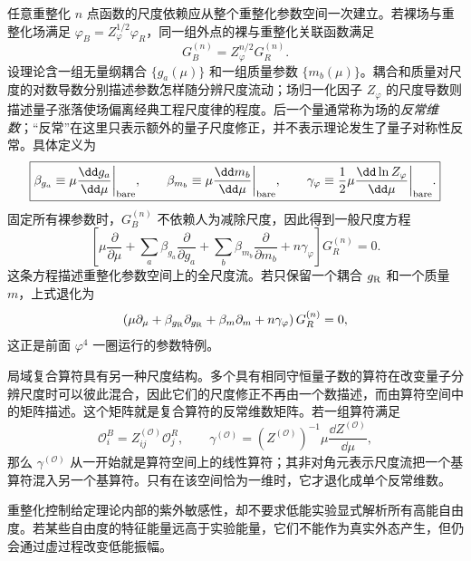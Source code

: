任意重整化 $n$ 点函数的尺度依赖应从整个重整化参数空间一次建立。若裸场与重整化场满足 $\varphi_B=Z_\varphi^{1/2}\varphi_R$，同一组外点的裸与重整化关联函数满足
\begin{equation}
 \boxed{
 G_B^{(n)}=Z_\varphi^{n/2}G_R^{(n)}.}
 \label{eq:bare-ren-green-relation-r68}
\end{equation}
设理论含一组无量纲耦合 $\{g_a(\mu)\}$ 和一组质量参数 $\{m_b(\mu)\}$。耦合和质量对尺度的对数导数分别描述参数怎样随分辨尺度流动；场归一化因子 $Z_\varphi$ 的尺度导数则描述量子涨落使场偏离经典工程尺度律的程度。后一个量通常称为场的\emph{反常维数}；“反常”在这里只表示额外的量子尺度修正，并不表示理论发生了量子对称性反常。具体定义为
\begin{equation}
\boxed{
 \beta_{g_a}\equiv\mu\frac{\dd g_a}{\dd\mu}\bigg|_{\rm bare},
 \qquad
 \beta_{m_b}\equiv\mu\frac{\dd m_b}{\dd\mu}\bigg|_{\rm bare},
 \qquad
 \gamma_\varphi\equiv\frac12\mu\frac{\dd\ln Z_\varphi}{\dd\mu}\bigg|_{\rm bare}.}
\label{eq:rg-general-flow-definitions-dp74}
\end{equation}
固定所有裸参数时，$G_B^{(n)}$ 不依赖人为减除尺度，因此得到一般尺度方程
\begin{equation}
 \boxed{
 \left[
 \mu\frac{\partial}{\partial\mu}
 +\sum_a\beta_{g_a}\frac{\partial}{\partial g_a}
 +\sum_b\beta_{m_b}\frac{\partial}{\partial m_b}
 +n\gamma_\varphi
 \right]G_R^{(n)}=0.}
 \label{eq:callan-symanzik-general-dp10}
\end{equation}
这条方程描述重整化参数空间上的全尺度流。若只保留一个耦合 $g_{\rm R}$ 和一个质量 $m$，上式退化为
\[
 \left(
 \mu\partial_\mu+\beta_{g_{\rm R}}\partial_{g_{\rm R}}
 +\beta_m\partial_m+n\gamma_\varphi
 \right)G_R^{(n)}=0,
\]
这正是前面 $\varphi^4$ 一圈运行的参数特例。

局域复合算符具有另一种尺度结构。多个具有相同守恒量子数的算符在改变量子分辨尺度时可以彼此混合，因此它们的尺度修正不再由一个数描述，而由算符空间中的矩阵描述。这个矩阵就是复合算符的反常维数矩阵。若一组算符满足
\begin{equation}
\boxed{
 \mathcal O_i^B=Z_{ij}^{(\mathcal O)}\mathcal O_j^R,
 \qquad
 \gamma^{(\mathcal O)}
 =(Z^{(\mathcal O)})^{-1}\mu\frac{\dd Z^{(\mathcal O)}}{\dd\mu},}
\label{eq:operator-mixing-general-dp74}
\end{equation}
那么 $\gamma^{(\mathcal O)}$ 从一开始就是算符空间上的线性算符；其非对角元表示尺度流把一个基算符混入另一个基算符。只有在该空间恰为一维时，它才退化成单个反常维数。

\label{sec:qft-eft-unitarity-dp10}
重整化控制给定理论内部的紫外敏感性，却不要求低能实验显式解析所有高能自由度。若某些自由度的特征能量远高于实验能量，它们不能作为真实外态产生，但仍会通过虚过程改变低能振幅。

